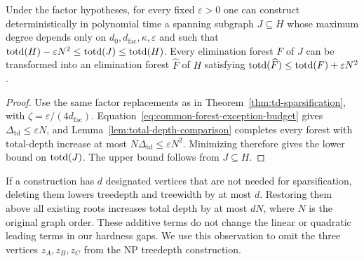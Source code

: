 \begin{theorem}
\label{thm:total-depth-sparsification}
Under the factor hypotheses, for every fixed $\varepsilon>0$
one can construct deterministically in polynomial time a spanning
subgraph $J\subseteq H$ whose maximum degree depends only on
$d_0,d_{\mathrm{fac}},\kappa,\varepsilon$ and such that
$\operatorname{totd}(H)-\varepsilon N^2\le\operatorname{totd}(J)\le\operatorname{totd}(H)$.
Every elimination forest $F$ of $J$ can be transformed into an
elimination forest $\widehat F$ of $H$ satisfying
$\operatorname{totd}(\widehat F)\le\operatorname{totd}(F)+\varepsilon N^2$.
\end{theorem}

\begin{proof}
Use the same factor replacements as in
Theorem~\ref{thm:td-sparsification}, with
$\zeta=\varepsilon/(4d_{\mathrm{fac}})$. Equation~\eqref{eq:common-forest-exception-budget}
gives $\Delta_{\mathrm{td}}\le\varepsilon N$, and
Lemma~\ref{lem:total-depth-comparison} completes every forest with
total-depth increase at most
$N\Delta_{\mathrm{td}}\le\varepsilon N^2$.
Minimizing therefore gives the lower bound on $\operatorname{totd}(J)$. The upper
bound follows from $J\subseteq H$.
\end{proof}

If a construction has $d$ designated vertices that are not needed
for sparsification, deleting them lowers treedepth and treewidth by
at most $d$. Restoring them above all existing roots increases total
depth by at most $dN$, where $N$ is the original graph order.
These additive terms do not change the linear or quadratic leading
terms in our hardness gaps. We use this observation to omit the three
vertices $z_A,z_B,z_C$ from the \textup{NP} treedepth construction.

